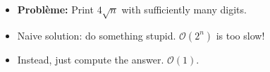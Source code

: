 \begin{frame}
    \frametitle{\problemtitle}
    \begin{itemize}
        \item<+-> \textbf{Problème:} Print $4\sqrt n$ with sufficiently many digits.
        \item<+-> Naive solution: do something stupid. $\mathcal O(2^n)$ is too slow!
        \item<+-> Instead, just compute the answer. $\mathcal O(1)$.
    \end{itemize}
\end{frame}

